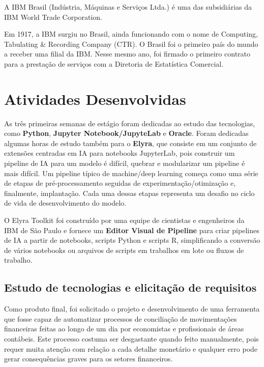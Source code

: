 \documentclass[english,brazil,oneside]{ifestagio}
\begin{document}
A IBM Brasil (Indústria, Máquinas e Serviços Ltda.) é uma das subsidiárias da IBM World Trade Corporation.

Em 1917, a IBM surgiu no Brasil, ainda funcionando com o nome de Computing, Tabulating & Recording Company (CTR). O Brasil foi o primeiro país do mundo a receber uma filial da IBM. Nesse mesmo ano, foi firmado o primeiro contrato para a prestação de serviços com a Diretoria de Estatística Comercial.


\chapter{Atividades Desenvolvidas}

As três primeiras semanas de estágio foram dedicadas ao estudo das tecnologias, como \textbf{Python}, \textbf{Jupyter Notebook/JupyteLab} e \textbf{Oracle}. Foram dedicadas algumas horas de estudo também para o \textbf{Elyra}, que consiste em um conjunto de extensões centradas em IA para notebooks JupyterLab, pois construir um pipeline de IA para um modelo é difícil, quebrar e modularizar um pipeline é mais difícil. Um pipeline típico de machine/deep learning começa como uma série de etapas de pré-processamento seguidas de experimentação/otimização e, finalmente, implantação. Cada uma dessas etapas representa um desafio no ciclo de vida de desenvolvimento do modelo.

O Elyra Toolkit foi construído por uma equipe de cientistas e engenheiros da IBM de São Paulo e fornece um \textbf{Editor Visual de Pipeline} para criar pipelines de IA a partir de notebooks, scripts Python e scripts R, simplificando a conversão de vários notebooks ou arquivos de scripts em trabalhos em lote ou fluxos de trabalho.



\section{Estudo de tecnologias e elicitação de requisitos}

Como produto final, foi solicitado o projeto e desenvolvimento de uma ferramenta que fosse capaz de automatizar processos de conciliação de movimentações financeiras feitas ao longo de um dia por economistas e profissionais de áreas contábeis. Este processo costuma ser desgastante quando feito manualmente, pois requer muita atenção com relação a cada detalhe monetário e qualquer erro pode gerar consequências graves para os setores financeiros. 
\end{document}
